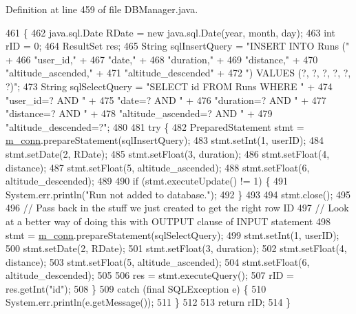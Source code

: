 Definition at line 459 of file D\+B\+Manager.\+java.


\begin{DoxyCode}
461                                                           \{
462         java.sql.Date RDate = \textcolor{keyword}{new} java.sql.Date(year, month, day);
463         \textcolor{keywordtype}{int} rID = 0;
464         ResultSet res;
465         String sqlInsertQuery = \textcolor{stringliteral}{"INSERT INTO Runs ("} +
466                 \textcolor{stringliteral}{"user\_id,"} +
467                 \textcolor{stringliteral}{"date,"} +
468                 \textcolor{stringliteral}{"duration,"} +
469                 \textcolor{stringliteral}{"distance,"} +
470                 \textcolor{stringliteral}{"altitude\_ascended,"} +
471                 \textcolor{stringliteral}{"altitude\_descended"} +
472                 \textcolor{stringliteral}{") VALUES (?, ?, ?, ?, ?, ?)"};
473         String sqlSelectQuery = \textcolor{stringliteral}{"SELECT id FROM Runs WHERE "} +
474                 \textcolor{stringliteral}{"user\_id=? AND "} +
475                 \textcolor{stringliteral}{"date=? AND "} +
476                 \textcolor{stringliteral}{"duration=? AND "} +
477                 \textcolor{stringliteral}{"distance=? AND "} +
478                 \textcolor{stringliteral}{"altitude\_ascended=? AND "} +
479                 \textcolor{stringliteral}{"altitude\_descended=?"};
480 
481         \textcolor{keywordflow}{try} \{
482             PreparedStatement stmt = \mbox{\hyperlink{classcom_1_1activitytracker_1_1_d_b_manager_a064088d13ac09eb147fdc19268771521}{m\_conn}}.prepareStatement(sqlInsertQuery);
483             stmt.setInt(1, userID);
484             stmt.setDate(2, RDate);
485             stmt.setFloat(3, duration);
486             stmt.setFloat(4, distance);
487             stmt.setFloat(5, altitude\_ascended);
488             stmt.setFloat(6, altitude\_descended);
489 
490             \textcolor{keywordflow}{if} (stmt.executeUpdate() != 1) \{
491                 System.err.println(\textcolor{stringliteral}{"Run not added to database."});
492             \}
493 
494             stmt.close();
495 
496             \textcolor{comment}{// Pass back in the stuff we just created to get the right row ID}
497             \textcolor{comment}{// Look at a better way of doing this with OUTPUT clause of INPUT statement}
498             stmt = \mbox{\hyperlink{classcom_1_1activitytracker_1_1_d_b_manager_a064088d13ac09eb147fdc19268771521}{m\_conn}}.prepareStatement(sqlSelectQuery);
499             stmt.setInt(1, userID);
500             stmt.setDate(2, RDate);
501             stmt.setFloat(3, duration);
502             stmt.setFloat(4, distance);
503             stmt.setFloat(5, altitude\_ascended);
504             stmt.setFloat(6, altitude\_descended);
505 
506             res = stmt.executeQuery();
507             rID = res.getInt(\textcolor{stringliteral}{"id"});
508         \}
509         \textcolor{keywordflow}{catch} (\textcolor{keyword}{final} SQLException e) \{
510             System.err.println(e.getMessage());
511         \}
512 
513         \textcolor{keywordflow}{return} rID;
514     \}
\end{DoxyCode}
